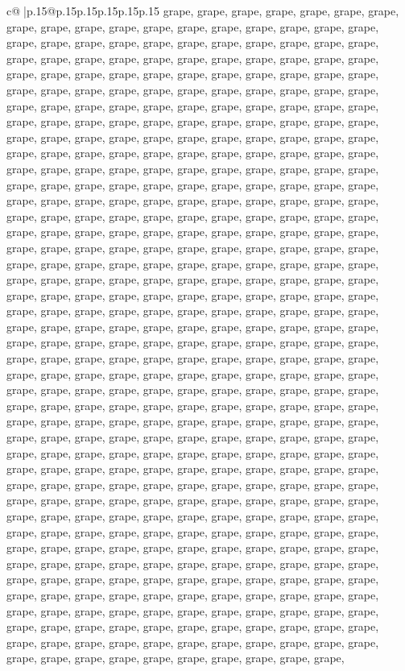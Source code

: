 \documentclass{article}
\begin{document}
{\begin{supertabular}{c@{$\;$}|p{.15\linewidth}@{}p{.15\linewidth}p{.15\linewidth}p{.15\linewidth}p{.15\linewidth}p{.15\linewidth}}
{{{grape, grape, grape, grape, grape, grape, grape, grape, grape, grape, grape, grape, grape, grape, grape, grape, grape, grape, grape, grape, grape, grape, grape, grape, grape, grape, grape, grape, grape, grape, grape, grape, grape, grape, grape, grape, grape, grape, grape, grape, grape, grape, grape, grape, grape, grape, grape, grape, grape, grape, grape, grape, grape, grape, grape, grape, grape, grape, grape, grape, grape, grape, grape, grape, grape, grape, grape, grape, grape, grape, grape, grape, grape, grape, grape, grape, grape, grape, grape, grape, grape, grape, grape, grape, grape, grape, grape, grape, grape, grape, grape, grape, grape, grape, grape, grape, grape, grape, grape, grape, grape, grape, grape, grape, grape, grape, grape, grape, grape, grape, grape, grape, grape, grape, grape, grape, grape, grape, grape, grape, grape, grape, grape, grape, grape, grape, grape, grape, grape, grape, grape, grape, grape, grape, grape, grape, grape, grape, grape, grape, grape, grape, grape, grape, grape, grape, grape, grape, grape, grape, grape, grape, grape, grape, grape, grape, grape, grape, grape, grape, grape, grape, grape, grape, grape, grape, grape, grape, grape, grape, grape, grape, grape, grape, grape, grape, grape, grape, grape, grape, grape, grape, grape, grape, grape, grape, grape, grape, grape, grape, grape, grape, grape, grape, grape, grape, grape, grape, grape, grape, grape, grape, grape, grape, grape, grape, grape, grape, grape, grape, grape, grape, grape, grape, grape, grape, grape, grape, grape, grape, grape, grape, grape, grape, grape, grape, grape, grape, grape, grape, grape, grape, grape, grape, grape, grape, grape, grape, grape, grape, grape, grape, grape, grape, grape, grape, grape, grape, grape, grape, grape, grape, grape, grape, grape, grape, grape, grape, grape, grape, grape, grape, grape, grape, grape, grape, grape, grape, grape, grape, grape, grape, grape, grape, grape, grape, grape, grape, grape, grape, grape, grape, grape, grape, grape, grape, grape, grape, grape, grape, grape, grape, grape, grape, grape, grape, grape, grape, grape, grape, grape, grape, grape, grape, grape, grape, grape, grape, grape, grape, grape, grape, grape, grape, grape, grape, grape, grape, grape, grape, grape, grape, grape, grape, grape, grape, grape, grape, grape, grape, grape, grape, grape, grape, grape, grape, grape, grape, grape, grape, grape, grape, grape, grape, grape, grape, grape, grape, grape, grape, grape, grape, grape, grape, grape, grape, grape, grape, grape, grape, grape, grape, grape, grape, grape, grape, grape, grape, grape, grape, grape, grape, grape, grape, grape, grape, grape, grape, grape, grape, grape, grape, grape, grape, grape, grape, grape, grape, grape, grape, grape, grape, grape, grape, grape, grape, grape, grape, grape, grape, grape, grape, grape, grape, grape, grape, grape, grape, grape, grape, grape, grape, grape, grape, grape, grape, grape, grape, grape, grape, grape, grape, grape, grape, grape, grape, grape, grape, grape, grape, grape, grape, grape, grape, grape, grape, grape, grape, grape, grape, grape, grape, grape, grape, grape, grape, grape, grape, grape, grape, grape, grape, grape, grape, grape, grape, grape, }}}
\end{supertabular}}
\end{document}

